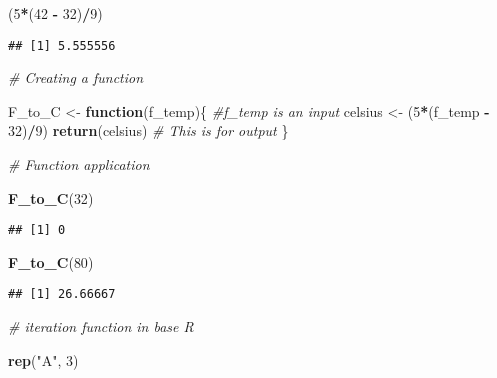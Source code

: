 \documentclass[
]{article}
\newenvironment{Shaded}{\begin{snugshade}}{\end{snugshade}}
\newcommand{\CommentTok}[1]{\textcolor[rgb]{0.56,0.35,0.01}{\textit{#1}}}
\newcommand{\ControlFlowTok}[1]{\textcolor[rgb]{0.13,0.29,0.53}{\textbf{#1}}}
\newcommand{\DecValTok}[1]{\textcolor[rgb]{0.00,0.00,0.81}{#1}}
\newcommand{\FunctionTok}[1]{\textcolor[rgb]{0.13,0.29,0.53}{\textbf{#1}}}
\newcommand{\NormalTok}[1]{#1}
\newcommand{\OtherTok}[1]{\textcolor[rgb]{0.56,0.35,0.01}{#1}}
\newcommand{\SpecialCharTok}[1]{\textcolor[rgb]{0.81,0.36,0.00}{\textbf{#1}}}
\newcommand{\StringTok}[1]{\textcolor[rgb]{0.31,0.60,0.02}{#1}}
\begin{document}
\begin{Shaded}
\begin{Highlighting}[]
\NormalTok{(}\DecValTok{5}\SpecialCharTok{*}\NormalTok{(}\DecValTok{42} \SpecialCharTok{{-}} \DecValTok{32}\NormalTok{)}\SpecialCharTok{/}\DecValTok{9}\NormalTok{)}
\end{Highlighting}
\end{Shaded}

\begin{verbatim}
## [1] 5.555556
\end{verbatim}

\begin{Shaded}
\begin{Highlighting}[]
\CommentTok{\# Creating a function }

\NormalTok{F\_to\_C }\OtherTok{\textless{}{-}} \ControlFlowTok{function}\NormalTok{(f\_temp)\{ }\CommentTok{\#f\_temp is an input}
\NormalTok{  celsius }\OtherTok{\textless{}{-}}\NormalTok{ (}\DecValTok{5}\SpecialCharTok{*}\NormalTok{(f\_temp }\SpecialCharTok{{-}} \DecValTok{32}\NormalTok{)}\SpecialCharTok{/}\DecValTok{9}\NormalTok{)}
  \FunctionTok{return}\NormalTok{(celsius) }\CommentTok{\# This is for output}
\NormalTok{\}}
\end{Highlighting}
\end{Shaded}

\begin{Shaded}
\begin{Highlighting}[]
\CommentTok{\# Function application }

\FunctionTok{F\_to\_C}\NormalTok{(}\DecValTok{32}\NormalTok{)}
\end{Highlighting}
\end{Shaded}

\begin{verbatim}
## [1] 0
\end{verbatim}

\begin{Shaded}
\begin{Highlighting}[]
\FunctionTok{F\_to\_C}\NormalTok{(}\DecValTok{80}\NormalTok{)}
\end{Highlighting}
\end{Shaded}

\begin{verbatim}
## [1] 26.66667
\end{verbatim}

\begin{Shaded}
\begin{Highlighting}[]
\CommentTok{\# iteration function in base R }

\FunctionTok{rep}\NormalTok{(}\StringTok{"A"}\NormalTok{, }\DecValTok{3}\NormalTok{)}
\end{Highlighting}
\end{Shaded}
\end{document}
